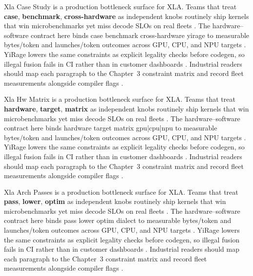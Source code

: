 Xla Case Study is a production bottleneck surface for XLA. Teams that treat \textbf{case}, \textbf{benchmark}, \textbf{cross-hardware} as independent knobs routinely ship kernels that win microbenchmarks yet miss decode SLOs on real fleets \citep{semianalysis2024tma,dlbook}. The hardware--software contract here binds case benchmark cross-hardware yirage to measurable bytes/token and launches/token outcomes across GPU, CPU, and NPU targets \citep{amd2024xdna,dao2022flashattention}. YiRage lowers the same constraints as explicit legality checks before codegen, so illegal fusion fails in CI rather than in customer dashboards \citep{amd2024aie,kwon2023vllm}. Industrial readers should map each paragraph to the Chapter~3 constraint matrix and record fleet measurements alongside compiler flags \citep{dlbook,nvidia2024cudagraphs}.

Xla Hw Matrix is a production bottleneck surface for XLA. Teams that treat \textbf{hardware}, \textbf{target}, \textbf{matrix} as independent knobs routinely ship kernels that win microbenchmarks yet miss decode SLOs on real fleets \citep{amd2024xdna,dao2022flashattention}. The hardware--software contract here binds hardware target matrix gpu|cpu|npu to measurable bytes/token and launches/token outcomes across GPU, CPU, and NPU targets \citep{amd2024aie,kwon2023vllm}. YiRage lowers the same constraints as explicit legality checks before codegen, so illegal fusion fails in CI rather than in customer dashboards \citep{dlbook,nvidia2024cudagraphs}. Industrial readers should map each paragraph to the Chapter~3 constraint matrix and record fleet measurements alongside compiler flags \citep{dao2022flashattention,liu2024deepseekv3}.

Xla Arch Passes is a production bottleneck surface for XLA. Teams that treat \textbf{pass}, \textbf{lower}, \textbf{optim} as independent knobs routinely ship kernels that win microbenchmarks yet miss decode SLOs on real fleets \citep{amd2024aie,kwon2023vllm}. The hardware--software contract here binds pass lower optim dialect to measurable bytes/token and launches/token outcomes across GPU, CPU, and NPU targets \citep{dlbook,nvidia2024cudagraphs}. YiRage lowers the same constraints as explicit legality checks before codegen, so illegal fusion fails in CI rather than in customer dashboards \citep{dao2022flashattention,liu2024deepseekv3}. Industrial readers should map each paragraph to the Chapter~3 constraint matrix and record fleet measurements alongside compiler flags \citep{kwon2023vllm,patel2025llminference}.

